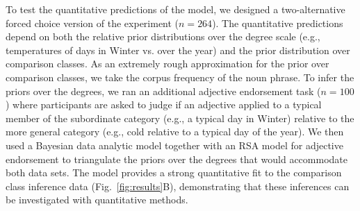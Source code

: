 \documentclass[letterpaper, 12pt]{article}
\begin{document}
To test the quantitative predictions of the model, we designed a two-alternative forced choice version of the experiment ($n=264$). The quantitative predictions depend on both the relative prior distributions over the degree scale (e.g., temperatures of days in Winter vs. over the year) and the prior distribution over comparison classes. 
As an extremely rough approximation for the prior over comparison classes, we take the corpus frequency of the noun phrase. 
To infer the priors over the degrees, we ran an additional adjective endorsement task ($n=100$) where participants are asked to judge if an adjective applied to a typical member of the subordinate category (e.g., a typical day in Winter) relative to the more general category (e.g., cold relative to a typical day of the year). 
We then used a Bayesian data analytic model together with an RSA model for adjective endorsement to triangulate the priors over the degrees that would accommodate both data sets.
The model provides a strong quantitative fit to the comparison class inference data (Fig.~\ref{fig:results}B), demonstrating that these inferences can be investigated with quantitative methods.




\end{document}
